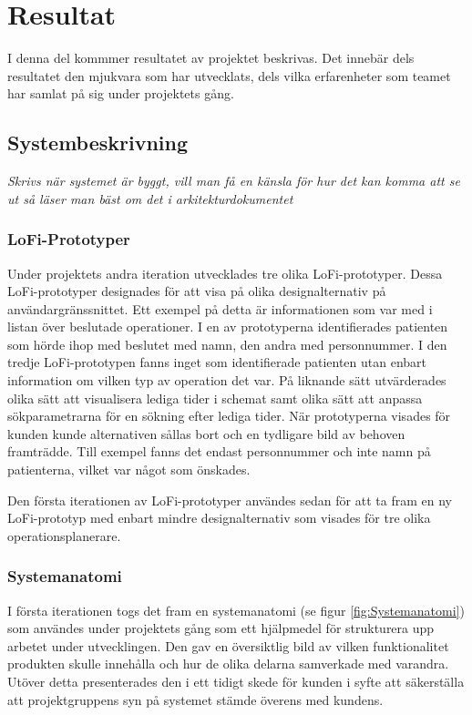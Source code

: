 \chapter{Resultat}
I denna del kommmer resultatet av projektet beskrivas. Det innebär dels
resultatet den mjukvara som har utvecklats, dels vilka erfarenheter som
teamet har samlat på sig under projektets gång.
\section{Systembeskrivning}
\textit{Skrivs när systemet är byggt, vill man få en känsla för hur det kan
komma att se ut så läser man bäst om det i arkitekturdokumentet}
\subsection{LoFi-Prototyper}
Under projektets andra iteration utvecklades tre olika LoFi-prototyper. Dessa
LoFi-prototyper designades för att visa på olika designalternativ på
användargränssnittet. Ett exempel på detta är informationen som var med i listan
över beslutade operationer. I en av prototyperna identifierades patienten som hörde ihop med beslutet med namn, den andra med personnummer. I den tredje LoFi-prototypen
fanns inget som identifierade patienten utan enbart information om vilken
typ av operation det var. På liknande sätt utvärderades olika sätt att
visualisera lediga tider i schemat samt olika sätt att anpassa sökparametrarna för en sökning efter lediga tider. När prototyperna visades för kunden kunde alternativen sållas bort och en tydligare bild av behoven framträdde.
Till exempel fanns det endast personnummer och inte namn på patienterna, vilket var något som önskades.

Den första iterationen av LoFi-prototyper användes sedan för att ta fram en ny
LoFi-prototyp med enbart mindre designalternativ som visades för tre olika
operationsplanerare.
\subsection{Systemanatomi}
I första iterationen togs det fram en systemanatomi (se figur \ref{fig:Systemanatomi}) som användes under projektets gång som ett hjälpmedel för strukturera upp arbetet under utvecklingen. Den gav en översiktlig bild av vilken funktionalitet produkten skulle innehålla och hur de olika delarna samverkade med varandra. Utöver detta presenterades den i ett tidigt skede för kunden i syfte att säkerställa att projektgruppens syn på systemet stämde överens med kundens. 

